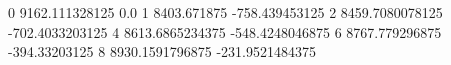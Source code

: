 0 9162.111328125 0.0
1 8403.671875 -758.439453125
2 8459.7080078125 -702.4033203125
4 8613.6865234375 -548.4248046875
6 8767.779296875 -394.33203125
8 8930.1591796875 -231.9521484375

